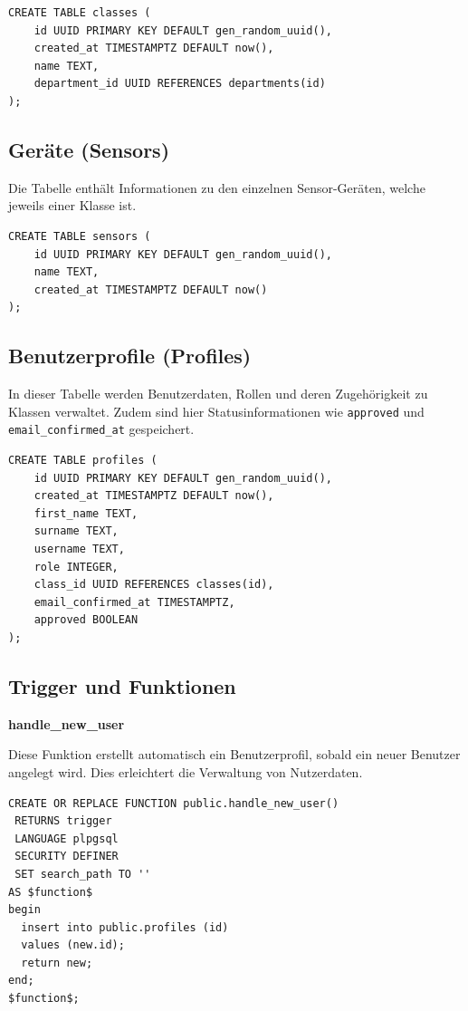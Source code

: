 \begin{inhalt}
\begin{lstlisting}[style=mysql]
CREATE TABLE classes (
    id UUID PRIMARY KEY DEFAULT gen_random_uuid(),
    created_at TIMESTAMPTZ DEFAULT now(),
    name TEXT,
    department_id UUID REFERENCES departments(id)
);
\end{lstlisting}

\subsection{Geräte (Sensors)}
Die Tabelle enthält Informationen zu den einzelnen Sensor-Geräten, welche jeweils einer Klasse  ist.

\begin{lstlisting}[style=mysql]
CREATE TABLE sensors (
    id UUID PRIMARY KEY DEFAULT gen_random_uuid(),
    name TEXT,
    created_at TIMESTAMPTZ DEFAULT now()
);
\end{lstlisting}

\subsection{Benutzerprofile (Profiles)}
In dieser Tabelle werden Benutzerdaten, Rollen und deren Zugehörigkeit zu Klassen verwaltet. Zudem sind hier Statusinformationen wie \texttt{approved} und \texttt{email\_confirmed\_at} gespeichert.

\begin{lstlisting}[style=mysql]
CREATE TABLE profiles (
    id UUID PRIMARY KEY DEFAULT gen_random_uuid(),
    created_at TIMESTAMPTZ DEFAULT now(),
    first_name TEXT,
    surname TEXT,
    username TEXT,
    role INTEGER,
    class_id UUID REFERENCES classes(id),
    email_confirmed_at TIMESTAMPTZ,
    approved BOOLEAN
);
\end{lstlisting}

\subsection{Trigger und Funktionen}

\textbf{handle\_new\_user}


Diese Funktion erstellt automatisch ein Benutzerprofil, sobald ein neuer Benutzer angelegt wird. Dies erleichtert die Verwaltung von Nutzerdaten.

\begin{lstlisting}[style=mysql]
CREATE OR REPLACE FUNCTION public.handle_new_user()
 RETURNS trigger
 LANGUAGE plpgsql
 SECURITY DEFINER
 SET search_path TO ''
AS $function$
begin
  insert into public.profiles (id)
  values (new.id);
  return new;
end;
$function$;
\end{lstlisting}


\end{inhalt}

